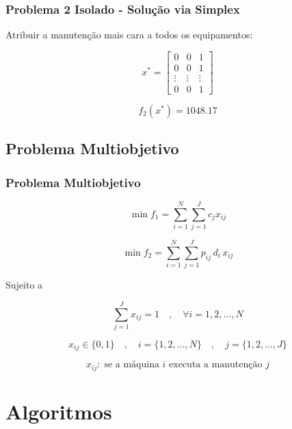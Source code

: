 \documentclass{beamer}
\newcommand{\un}[1]{\;\text{#1}}
\begin{document}
    \begin{frame}
        \frametitle{Problema 2 Isolado - Solução via Simplex}

        \begin{center}
            Atribuir a manutenção mais cara a todos os equipamentos:
        \end{center}

        \[ x^{*} = \begin{bmatrix} 
            0 & 0 & 1 \\
            0 & 0 & 1 \\
            \vdots & \vdots & \vdots \\
            0 &  0      & 1 
            \end{bmatrix} \]

        \vspace{1cm}

       \[ f_2\left(x^{*}\right) = 1048.17 \]
    \end{frame}

    \subsection{Problema Multiobjetivo}
    \begin{frame}
        \frametitle{Problema Multiobjetivo}

        \[  \min f_1 = \sum_{i=1}^{N} \sum_{j=1}^{J} c_j x_{ij} \]

        \[  \min f_2 = \sum_{i=1}^{N} \sum_{j=1}^{J} p_{ij} \, d_i \, x_{ij} \]

        Sujeito a 

        \[ \sum_{j=1}^{J} x_{ij} = 1 \quad , \quad \forall i = {1, 2, ..., N} \]

        \[ x_{ij} \in \{0,1\} \quad , \quad i = \{1, 2, ..., N\}  \quad , \quad j = \{1, 2, ..., J\} \]

        \[  x_{ij}: \un{se a máquina $i$ executa a manutenção $j$}  \]

    \end{frame}

\section{Algoritmos}
\end{document}
